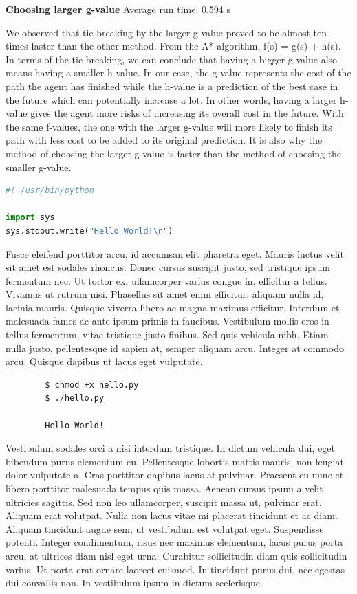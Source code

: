 \documentclass{article}
\begin{document}
\textbf{Choosing larger g-value}
Average run time: 0.594 s


We observed that tie-breaking by the larger g-value proved to be almost ten times faster than the other method. From the A* algorithm, f(s) = g(s) + h(s). In terms of the tie-breaking, we can conclude that having a bigger g-value also means having a smaller h-value. In our case, the g-value represents the cost of the path the agent has finished while the h-value is a prediction of the best case in the future which can potentially increase a lot. In other words, having a larger h-value gives the agent more risks of increasing its overall cost in the future. With the same f-values, the one with the larger g-value will more likely to finish its path with less cost to be added to its original prediction. It is also why the method of choosing the larger g-value is faster than the method of choosing the smaller g-value.

\begin{file}[hello.py]
\begin{lstlisting}[language=Python]
#! /usr/bin/python

import sys
sys.stdout.write("Hello World!\n")
\end{lstlisting}
\end{file}

Fusce eleifend porttitor arcu, id accumsan elit pharetra eget. Mauris luctus velit sit amet est sodales rhoncus. Donec cursus suscipit justo, sed tristique ipsum fermentum nec. Ut tortor ex, ullamcorper varius congue in, efficitur a tellus. Vivamus ut rutrum nisi. Phasellus sit amet enim efficitur, aliquam nulla id, lacinia mauris. Quisque viverra libero ac magna maximus efficitur. Interdum et malesuada fames ac ante ipsum primis in faucibus. Vestibulum mollis eros in tellus fermentum, vitae tristique justo finibus. Sed quis vehicula nibh. Etiam nulla justo, pellentesque id sapien at, semper aliquam arcu. Integer at commodo arcu. Quisque dapibus ut lacus eget vulputate.

\begin{commandline}
	\begin{verbatim}
		$ chmod +x hello.py
		$ ./hello.py

		Hello World!
	\end{verbatim}
\end{commandline}

Vestibulum sodales orci a nisi interdum tristique. In dictum vehicula dui, eget bibendum purus elementum eu. Pellentesque lobortis mattis mauris, non feugiat dolor vulputate a. Cras porttitor dapibus lacus at pulvinar. Praesent eu nunc et libero porttitor malesuada tempus quis massa. Aenean cursus ipsum a velit ultricies sagittis. Sed non leo ullamcorper, suscipit massa ut, pulvinar erat. Aliquam erat volutpat. Nulla non lacus vitae mi placerat tincidunt et ac diam. Aliquam tincidunt augue sem, ut vestibulum est volutpat eget. Suspendisse potenti. Integer condimentum, risus nec maximus elementum, lacus purus porta arcu, at ultrices diam nisl eget urna. Curabitur sollicitudin diam quis sollicitudin varius. Ut porta erat ornare laoreet euismod. In tincidunt purus dui, nec egestas dui convallis non. In vestibulum ipsum in dictum scelerisque.
\end{document}
